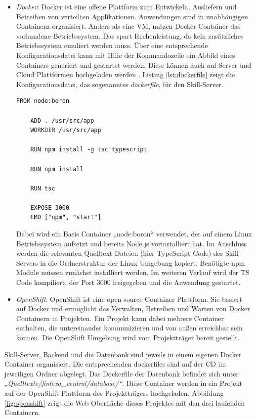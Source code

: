 \begin{itemize}
    \item \textit{Docker}: Docker ist eine offene Plattform zum Entwickeln, Ausliefern und Betreiben von verteilten Applikationen. Anwendungen sind in unabhängigen Containern organisiert. Anders als eine \ac{VM}, nutzen Docker Container das vorhandene Betriebssystem. Das spart Rechenleistung, da kein zusätzliches Betriebssystem emuliert werden muss. Über eine entsprechende Konfigurationsdatei kann mit Hilfe der Kommandozeile ein Abbild eines Containers generiert und gestartet werden. Diese können auch auf Server und Cloud Plattformen hochgeladen werden \cite{docker}. Listing \ref{lst:dockerfile} zeigt die Konfigurationsdatei, das sogenanntes \textit{dockerfile}, für den Skill-Server.\newpage
    
    \begin{lstlisting}[language={HTML},caption={Dockerfile des Voice Bank Skill-Servers},label={lst:dockerfile}]
    FROM node:boron

    ADD . /usr/src/app
    WORKDIR /usr/src/app
    
    RUN npm install -g tsc typescript
    
    RUN npm install
    
    RUN tsc 
    
    EXPOSE 3000
    CMD ["npm", "start"]

    \end{lstlisting}
    
    Dabei wird ein Basis Container „node:boron“ verwendet, der auf einem Linux Betriebssystem aufsetzt und bereits Node.js vorinstalliert hat. Im Anschluss werden die relevanten Quelltext Dateien (hier TypeScript Code) des Skill-Servers in die Ordnerstruktur der Linux Umgebung kopiert. Benötigte \ac{npm} Module müssen zunächst installiert werden. Im weiteren Verlauf wird der \ac{TS} Code kompiliert, der Port 3000 freigegeben und die Anwendung gestartet.
    
    \item \textit{OpenShift}: OpenShift ist eine open source Container Plattform. Sie basiert \ua auf Docker und ermöglicht das Verwalten, Betreiben und Warten von Docker Containern in Projekten. Ein Projekt kann dabei mehrere Container enthalten, die untereinander kommunizieren und von außen erreichbar sein können. Die OpenShift Umgebung wird vom Projektträger bereit gestellt. 
\end{itemize}

Skill-Server, Backend und die Datenbank sind jeweils in einem eigenen Docker Container organisiert. Die entsprechenden dockerfiles sind auf der CD im jeweiligen Ordner abgelegt. Das Dockerfile der Datenbank befindet sich unter \textit{„Quelltexte/finlexa\_central/database/“}. Diese Container werden in ein Projekt auf der OpenShift Plattform des Projektträgers hochgeladen. Abbildung \ref{fig:openshift} zeigt die Web Oberfläche dieses Projektes mit den drei laufenden Containern.\newpage

